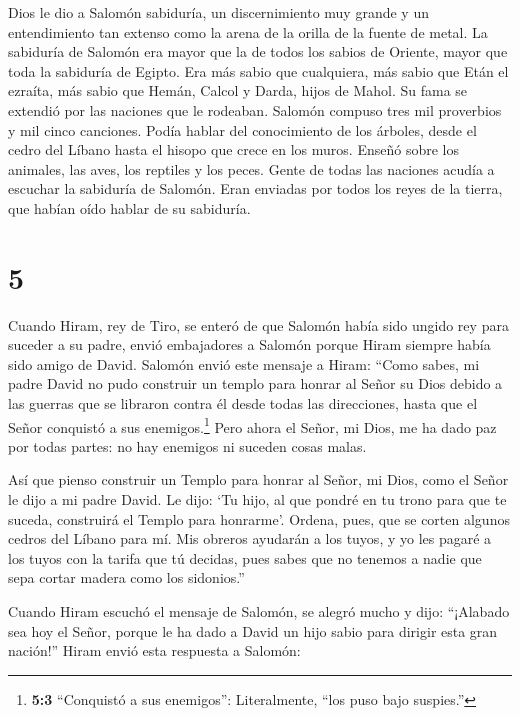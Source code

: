  Dios le dio a Salomón sabiduría, un discernimiento muy
grande y un entendimiento tan extenso como la arena de la orilla de la
fuente de metal.  La sabiduría de Salomón era mayor que la
de todos los sabios de Oriente, mayor que toda la sabiduría de Egipto.
 Era más sabio que cualquiera, más sabio que Etán el
ezraíta, más sabio que Hemán, Calcol y Darda, hijos de Mahol. Su fama se
extendió por las naciones que le rodeaban.  Salomón compuso
tres mil proverbios y mil cinco canciones.  Podía hablar
del conocimiento de los árboles, desde el cedro del Líbano hasta el
hisopo que crece en los muros. Enseñó sobre los animales, las aves, los
reptiles y los peces.  Gente de todas las naciones acudía a
escuchar la sabiduría de Salomón. Eran enviadas por todos los reyes de
la tierra, que habían oído hablar de su sabiduría.

\hypertarget{section-4}{%
\section{5}\label{section-4}}

 Cuando Hiram, rey de Tiro, se enteró de que Salomón había
sido ungido rey para suceder a su padre, envió embajadores a Salomón
porque Hiram siempre había sido amigo de David.  Salomón
envió este mensaje a Hiram:  ``Como sabes, mi padre David no
pudo construir un templo para honrar al Señor su Dios debido a las
guerras que se libraron contra él desde todas las direcciones, hasta que
el Señor conquistó a sus enemigos.\footnote{\textbf{5:3} ``Conquistó a
  sus enemigos'': Literalmente, ``los puso bajo suspies.''} 
Pero ahora el Señor, mi Dios, me ha dado paz por todas partes: no hay
enemigos ni suceden cosas malas.

 Así que pienso construir un Templo para honrar al Señor, mi
Dios, como el Señor le dijo a mi padre David. Le dijo: `Tu hijo, al que
pondré en tu trono para que te suceda, construirá el Templo para
honrarme'.  Ordena, pues, que se corten algunos cedros del
Líbano para mí. Mis obreros ayudarán a los tuyos, y yo les pagaré a los
tuyos con la tarifa que tú decidas, pues sabes que no tenemos a nadie
que sepa cortar madera como los sidonios.''

 Cuando Hiram escuchó el mensaje de Salomón, se alegró mucho
y dijo: ``¡Alabado sea hoy el Señor, porque le ha dado a David un hijo
sabio para dirigir esta gran nación!''  Hiram envió esta
respuesta a Salomón:

